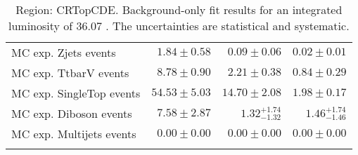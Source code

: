 \begin{table}
\begin{center}
{\begin{tabular*}{\textwidth}{@{\extracolsep{\fill}}lrrr}
        MC exp. Zjets events         & $1.84 \pm 0.58$          & $0.09 \pm 0.06$          & $0.02 \pm 0.01$              \\
        MC exp. TtbarV events         & $8.78 \pm 0.90$          & $2.21 \pm 0.38$          & $0.84 \pm 0.29$              \\
        MC exp. SingleTop events         & $54.53 \pm 5.03$          & $14.70 \pm 2.08$          & $1.98 \pm 0.17$              \\
        MC exp. Diboson events         & $7.58 \pm 2.87$          & $1.32_{-1.32}^{+1.74}$          & $1.46_{-1.46}^{+1.74}$              \\
        MC exp. Multijets events         & $0.00 \pm 0.00$          & $0.00 \pm 0.00$          & $0.00 \pm 0.00$              \\
\noalign{\smallskip}\hline\noalign{\smallskip}
\end{tabular*}
}
\end{center}
\caption{Region: CRTopCDE. Background-only fit results for an integrated luminosity of 36.07 \ifb. The uncertainties are statistical and systematic.
}
\label{table.bkgonly.CRTopCDE}
\end{table}
%